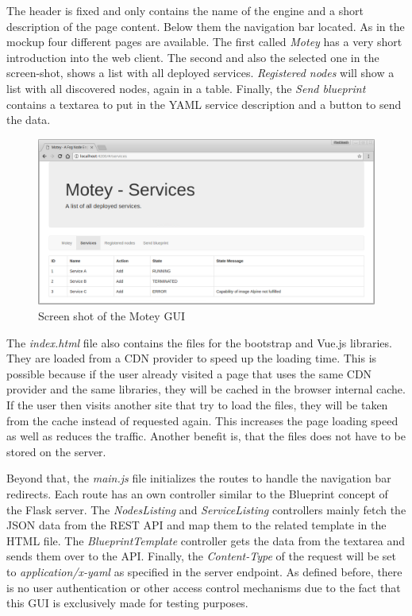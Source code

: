 The header is fixed and only contains the name of the engine and a short description of the page content.
Below them the navigation bar located.
As in the mockup four different pages are available.
The first called \textit{Motey} has a very short introduction into the web client.
The second and also the selected one in the screen-shot, shows a list with all deployed services.
\textit{Registered nodes} will show a list with all discovered nodes, again in a table.
Finally, the \textit{Send blueprint} contains a textarea to put in the \ac{YAML} service description and a button to send the data.\newline

\begin{figure}[H]
    \centering
    \includegraphics[width=\textwidth]{resources/images/motey_gui_screenshot.png}
    \caption[Screen shot of the Motey GUI]{Screen shot of the Motey \ac{GUI}}
    \label{fig:motey_gui_screenshot}
\end{figure}

The \textit{index.html} file also contains the files for the bootstrap and Vue.js libraries.
They are loaded from a \ac{CDN} provider to speed up the loading time.
This is possible because if the user already visited a page that uses the same \ac{CDN} provider and the same libraries, they will be cached in the browser internal cache.
If the user then visits another site that try to load the files, they will be taken from the cache instead of requested again.
This increases the page loading speed as well as reduces the traffic.
Another benefit is, that the files does not have to be stored on the server.\newline

Beyond that, the \textit{main.js} file initializes the routes to handle the navigation bar redirects.
Each route has an own controller similar to the Blueprint concept of the Flask server.
The \textit{NodesListing} and \textit{ServiceListing} controllers mainly fetch the \ac{JSON} data from the \ac{REST} \ac{API} and map them to the related template in the \ac{HTML} file.
The \textit{BlueprintTemplate} controller gets the data from the textarea and sends them over to the \ac{API}.
Finally, the \textit{Content-Type} of the request will be set to \textit{application/x-yaml} as specified in the server endpoint.
As defined before, there is no user authentication or other access control mechanisms due to the fact that this \ac{GUI} is exclusively made for testing purposes.

